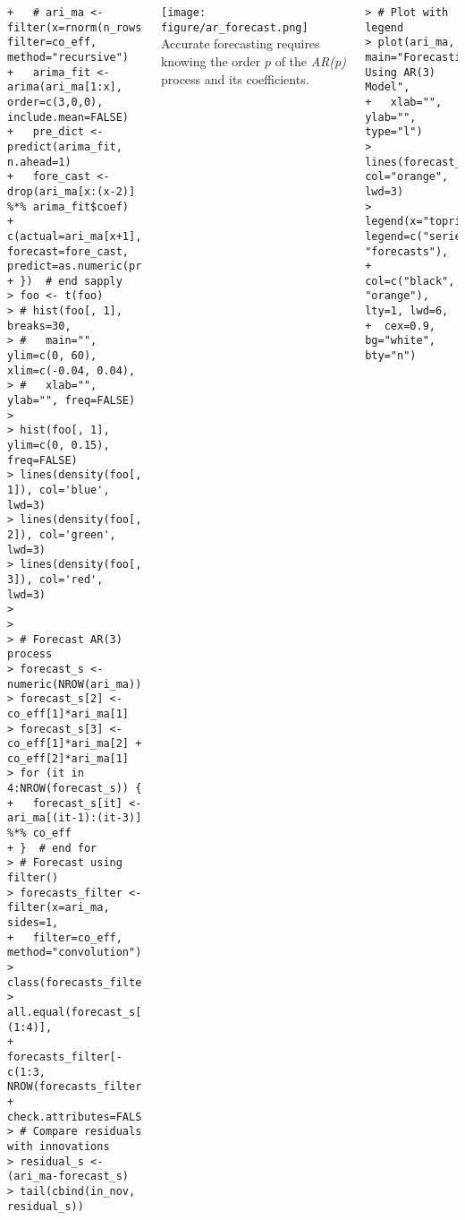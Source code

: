 \documentclass[10pt]{beamer}\usepackage[]{graphicx}\usepackage[]{color}
\makeatletter
\newenvironment{kframe}{%
 \def\at@end@of@kframe{}%
 \ifinner\ifhmode%
  \def\at@end@of@kframe{\end{minipage}}%
  \begin{minipage}{\columnwidth}%
 \fi\fi%
 \def\FrameCommand##1{\hskip\@totalleftmargin \hskip-\fboxsep
 \colorbox{shadecolor}{##1}\hskip-\fboxsep
     \hskip-\linewidth \hskip-\@totalleftmargin \hskip\columnwidth}%
 \MakeFramed {\advance\hsize-\width
   \@totalleftmargin\z@ \linewidth\hsize
   \@setminipage}}%
 {\par\unskip\endMakeFramed%
 \at@end@of@kframe}
\newenvironment{knitrout}{}{} %
\makeatother
\begin{document}
\begin{frame}[fragile,t]{\subsecname}
\begin{block}{}
\begin{columns}[T]
\begin{knitrout}
\begin{kframe}
\begin{verbatim}
+   # ari_ma <- filter(x=rnorm(n_rows+1), filter=co_eff, method="recursive")
+   arima_fit <- arima(ari_ma[1:x], order=c(3,0,0), include.mean=FALSE)
+   pre_dict <- predict(arima_fit, n.ahead=1)
+   fore_cast <- drop(ari_ma[x:(x-2)] %*% arima_fit$coef)
+   c(actual=ari_ma[x+1], forecast=fore_cast, predict=as.numeric(pre_dict$pred))
+ })  # end sapply
> foo <- t(foo)
> # hist(foo[, 1], breaks=30,
> #   main="", ylim=c(0, 60), xlim=c(-0.04, 0.04),
> #   xlab="", ylab="", freq=FALSE)
> 
> hist(foo[, 1], ylim=c(0, 0.15), freq=FALSE)
> lines(density(foo[, 1]), col='blue', lwd=3)
> lines(density(foo[, 2]), col='green', lwd=3)
> lines(density(foo[, 3]), col='red', lwd=3)
> 
> 
> # Forecast AR(3) process
> forecast_s <- numeric(NROW(ari_ma))
> forecast_s[2] <- co_eff[1]*ari_ma[1]
> forecast_s[3] <- co_eff[1]*ari_ma[2] + co_eff[2]*ari_ma[1]
> for (it in 4:NROW(forecast_s)) {
+   forecast_s[it] <- ari_ma[(it-1):(it-3)] %*% co_eff
+ }  # end for
> # Forecast using filter()
> forecasts_filter <- filter(x=ari_ma, sides=1,
+   filter=co_eff, method="convolution")
> class(forecasts_filter)
> all.equal(forecast_s[-(1:4)],
+   forecasts_filter[-c(1:3, NROW(forecasts_filter))],
+   check.attributes=FALSE)
> # Compare residuals with innovations
> residual_s <- (ari_ma-forecast_s)
> tail(cbind(in_nov, residual_s))
\end{verbatim}
\end{kframe}
\end{knitrout}
      \texttt{[image: figure/ar\_forecast.png]}
      Accurate forecasting requires knowing the order $p$ of the \emph{AR(p)} process and its coefficients.
\begin{knitrout}\tiny
{}\color{fgcolor}\begin{kframe}
\begin{verbatim}
> # Plot with legend
> plot(ari_ma, main="Forecasting Using AR(3) Model",
+   xlab="", ylab="", type="l")
> lines(forecast_s, col="orange", lwd=3)
> legend(x="topright", legend=c("series", "forecasts"),
+  col=c("black", "orange"), lty=1, lwd=6,
+  cex=0.9, bg="white", bty="n")
\end{verbatim}
\end{kframe}
\end{knitrout}
  \end{columns}
\end{block}

\end{frame}
\end{document}

